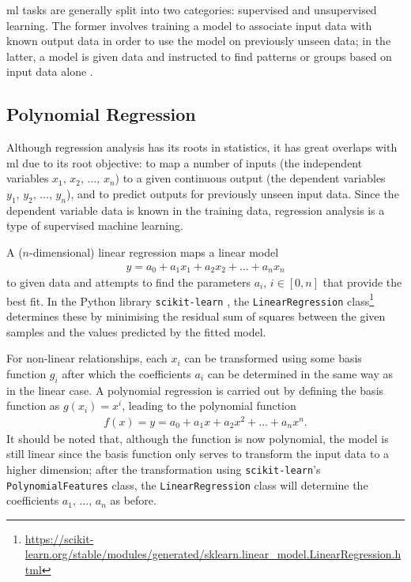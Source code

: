 \ac{ml} tasks are generally split into two categories: supervised and unsupervised learning. The former involves training a model to associate input data with known output data in order to use the model on previously unseen data; in the latter, a model is given data and instructed to find patterns or groups based on input data alone \cite[]{goodfellow_deep_2016,kelleher_fundamentals_2015}.

\subsection{Polynomial Regression} \label{sec:polyreg}
Although regression analysis has its roots in statistics, it has great overlaps with \ac{ml} due to its root objective: to map a number of inputs (the independent variables \(x_1,\,x_2,\,\ldots,\,x_n\)) to a given continuous output (the dependent variables \(y_1,\,y_2,\,\ldots,\,y_n\)), and to predict outputs for previously unseen input data. Since the dependent variable data is known in the training data, regression analysis is a type of supervised machine learning.

A (\(n\)-dimensional) linear regression maps a linear model
\begin{align}
    y = a_0 + a_1 x_1 + a_2 x_2 + \ldots + a_n x_n
\end{align}
to given data and attempts to find the parameters \(a_i\), \(i \in \left[0, n\right]\) that provide the best fit. In the Python library \texttt{scikit-learn} \cite[]{scikit-learn}, the \texttt{LinearRegression} class\footnote{\url{https://scikit-learn.org/stable/modules/generated/sklearn.linear_model.LinearRegression.html}} determines these by minimising the residual sum of squares between the given samples and the values predicted by the fitted model.

For non-linear relationships, each \(x_i\) can be transformed using some basis function \(g_i\) after which the coefficients \(a_i\) can be determined in the same way as in the linear case. A polynomial regression is carried out by defining the basis function as \(g(x_i) = x^i\), leading to the polynomial function
\begin{align}
    f(x) = y = a_0 + a_1 x + a_2 x^2 + \ldots + a_n x^n.
\end{align}
It should be noted that, although the function is now polynomial, the model is still linear since the basis function only serves to transform the input data to a higher dimension; after the transformation using \texttt{scikit-learn}'s \texttt{PolynomialFeatures} class, the \texttt{LinearRegression} class will determine the coefficients \(a_1,\,\ldots,\,a_n\) as before.

